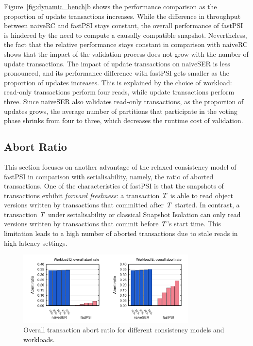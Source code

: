 Figure~\ref{fig:dynamic_bench}b shows the performance comparison as the proportion of update transactions increases. While the difference in throughput between naiveRC and fastPSI stays constant, the overall performance of fastPSI is hindered by the need to compute a causally compatible snapshot. Nevertheless, the fact that the relative performance stays constant in comparison with naiveRC shows that the impact of the validation process does not grow with the number of update transactions. The impact of update transactions on naiveSER is less pronounced, and its performance difference with fastPSI gets smaller as the proportion of updates increases. This is explained by the choice of workload: read-only transactions perform four reads, while update transactions perform three. Since naiveSER also validates read-only transactions, as the proportion of updates grows, the average number of partitions that participate in the voting phase shrinks from four to three, which decreases the runtime cost of validation.

\subsection{Abort Ratio}
\label{subsect:abort_ratio}

This section focuses on another advantage of the relaxed consistency model of fastPSI in comparison with serialisability, namely, the ratio of aborted transactions. One of the characteristics of fastPSI is that the snapshots of transactions exhibit \emph{forward freshness}: a transaction $\mathit{T}$ is able to read object versions written by transactions that committed after $\mathit{T}$ started. In contrast, a transaction $\mathit{T}$ under serialisability or classical Snapshot Isolation can only read versions written by transactions that commit before $\mathit{T}$'s start time. This limitation leads to a high number of aborted transactions due to stale reads in high latency settings.

\begin{figure}[t]
\begin{center}
\includegraphics[width=0.8\textwidth]{figures/abort_rate_bench_overall.pdf}
\vspace{-0.75cm}
\end{center}
\caption{Overall transaction abort ratio for different consistency models and workloads.}
\label{fig:raw_abort_rate_overall}
\end{figure}

